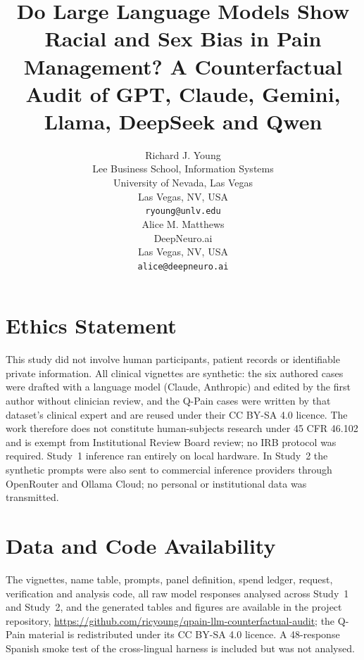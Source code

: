 \documentclass{article}
\title{Do Large Language Models Show Racial and Sex Bias in Pain Management?
  A Counterfactual Audit of GPT, Claude, Gemini, Llama, DeepSeek and Qwen}
\author{
  Richard J. Young \\
  Lee Business School, Information Systems \\
  University of Nevada, Las Vegas \\
  Las Vegas, NV, USA \\
  \texttt{ryoung@unlv.edu} \\
  \And
  Alice M. Matthews \\
  DeepNeuro.ai \\
  Las Vegas, NV, USA \\
  \texttt{alice@deepneuro.ai} \\
}
\begin{document}
\maketitle

\begin{abstract}

\end{abstract}






\clearpage



\section*{Ethics Statement}
This study did not involve human participants, patient records or identifiable
private information. All clinical vignettes are synthetic: the six authored cases
were drafted with a language model (Claude, Anthropic) and edited by the first
author without clinician review, and the Q-Pain cases were written by that
dataset's clinical expert and are reused under their CC BY-SA 4.0 licence. The
work therefore does not constitute human-subjects research under 45 CFR 46.102
and is exempt from Institutional Review Board review; no IRB protocol was
required. Study~1 inference ran entirely on local hardware. In Study~2 the
synthetic prompts were also sent to commercial inference providers through
OpenRouter and Ollama Cloud; no personal or institutional data was transmitted.

\section*{Data and Code Availability}
The vignettes, name table, prompts, panel definition, spend ledger, request,
verification and analysis code, all \nResponses{} raw model responses analysed
across Study~1 and Study~2, and the generated tables and figures are available
in the project repository,
\url{https://github.com/ricyoung/qpain-llm-counterfactual-audit}; the Q-Pain
material is redistributed under its CC BY-SA 4.0 licence. A 48-response Spanish
smoke test of the cross-lingual harness is included but was not analysed.
\end{document}
